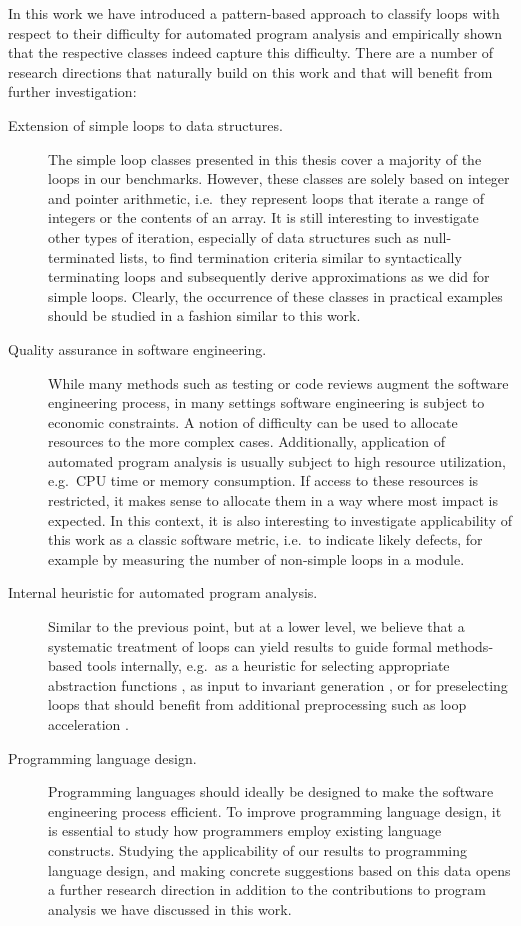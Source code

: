 In this work we have introduced a pattern-based approach to classify loops with respect to their difficulty for automated program analysis and empirically shown that the respective classes indeed capture this difficulty. There are a number of research directions that naturally build on this work and that will benefit from further investigation:

\begin{description}
    \item[Extension of simple loops to data structures.] The simple loop classes presented in this thesis cover a majority of the loops in our benchmarks. However, these classes are solely based on integer and pointer arithmetic, i.e.\ they represent loops that iterate a range of integers or the contents of an array. It is still interesting to investigate other types of iteration, especially of data structures such as null-terminated lists, to find termination criteria similar to syntactically terminating loops and subsequently derive approximations as we did for simple loops. Clearly, the occurrence of these classes in practical examples should be studied in a fashion similar to this work.
    \item[Quality assurance in software engineering.] While many methods such as testing or code reviews augment the software engineering process, in many settings software engineering is subject to economic constraints. A notion of difficulty can be used to allocate resources to the more complex cases. Additionally, application of automated program analysis is usually subject to high resource utilization, e.g.\ CPU time or memory consumption. If access to these resources is restricted, it makes sense to allocate them in a way where most impact is expected. In this context, it is also interesting to investigate applicability of this work as a classic software metric, i.e.\ to indicate likely defects, for example by measuring the number of non-simple loops in a module.
    \item[Internal heuristic for automated program analysis.] Similar to the previous point, but at a lower level, we believe that a systematic treatment of loops can yield results to guide formal methods-based tools internally, e.g.\ as a heuristic for selecting appropriate abstraction functions \cite{DBLP:journals/corr/abs-1305-6745}, as input to invariant generation \cite{DBLP:conf/fase/KovacsV09}, or for preselecting loops that should benefit from additional preprocessing such as loop acceleration \cite{DBLP:conf/cav/KroeningLW13}.
    \item[Programming language design.] Programming languages should ideally be designed to make the software engineering process efficient. To improve programming language design, it is essential to study how programmers employ existing language constructs. Studying the applicability of our results to programming language design, and making concrete suggestions based on this data opens a further research direction in addition to the contributions to program analysis we have discussed in this work.
\end{description}
